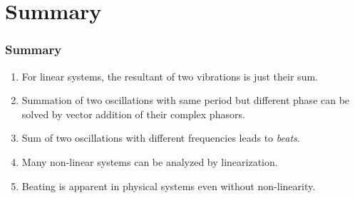 \documentclass[pdf,hideothersubsections]{beamer}
\begin{document}
\section{Summary}
\begin{frame}
\frametitle{Summary}
\begin{enumerate}
\item For linear systems, the resultant of two vibrations is just their sum.
\pause
\item Summation of two oscillations with same period but different phase can be solved by vector addition of their complex phasors.
\pause
\item Sum of two oscillations with different frequencies leads to \emph{beats}.
\pause
\item Many non-linear systems can be analyzed by linearization.
\pause
\item Beating is apparent in physical systems even without non-linearity.
\end{enumerate}
\end{frame}
\end{document}
